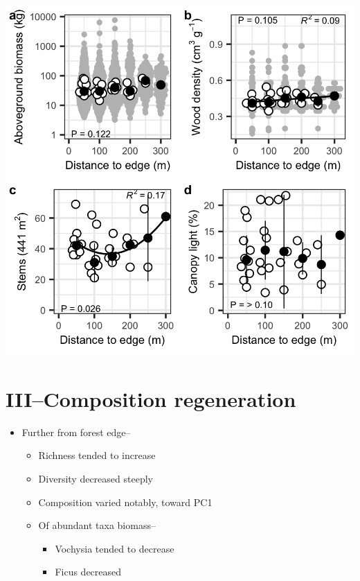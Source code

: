 \documentclass[
]{article}
\begin{document}
\includegraphics{../figs/fig1.png}

\hypertarget{iiicomposition-regeneration}{%
\section{III--Composition
regeneration}\label{iiicomposition-regeneration}}

\begin{itemize}
\item
  Further from forest edge--

  \begin{itemize}
  \item
    Richness tended to increase
  \item
    Diversity decreased steeply
  \item
    Composition varied notably, toward PC1
  \item
    Of abundant taxa biomass--

    \begin{itemize}
    \item
      Vochysia tended to decrease
    \item
      Ficus decreased
    \end{itemize}
  \end{itemize}
\end{itemize}
\end{document}
